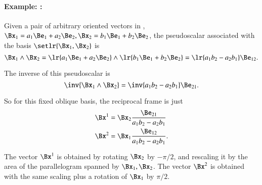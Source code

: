 \paragraph{Example: :}

Given a pair of arbitrary oriented vectors in , \( \Bx_1 = a_1 \Be_1 + a_2 \Be_2, \Bx_2 = b_1 \Be_1 + b_2 \Be_2 \), the pseudoscalar associated with the basis \( \setlr{ \Bx_1, \Bx_2} \) is
\begin{dmath}\label{eqn:reciprocal_R2:260}
\Bx_1 \wedge \Bx_2
=
\lr{ a_1 \Be_1 + a_2 \Be_2 } \wedge \lr{ b_1 \Be_1 + b_2 \Be_2 }
=
\lr{ a_1 b_2 - a_2 b_1 } \Be_{12}.
\end{dmath}

The inverse of this pseudoscalar is
\begin{dmath}\label{eqn:reciprocal_R2:280}
\inv{\Bx_1 \wedge \Bx_2 }
=
\inv{ a_1 b_2 - a_2 b_1 } \Be_{21}.
\end{dmath}

So for this fixed oblique  basis, the reciprocal frame is just
\begin{dmath}\label{eqn:reciprocal_R2:300}
\begin{aligned}
\Bx^1 &= \Bx_2 \frac{\Be_{21}}{ a_1 b_2 - a_2 b_1 } \\
\Bx^2 &= \Bx_1 \frac{\Be_{12}}{ a_1 b_2 - a_2 b_1 }.
\end{aligned}
\end{dmath}

The vector \( \Bx^1 \) is obtained by rotating \( \Bx_2 \) by \( -\pi/2 \), and rescaling it by the area of the parallelogram spanned by \( \Bx_1, \Bx_2 \).
The vector \( \Bx^2 \) is obtained with the same scaling plus a rotation of \( \Bx_1 \) by \( \pi/2 \).

